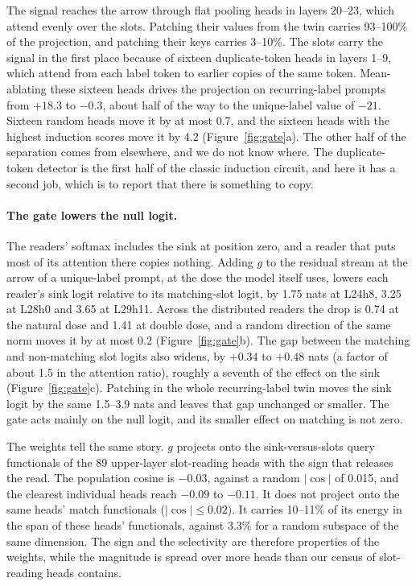 \documentclass{article}
\newcommand{\head}[2]{L#1h#2}
\begin{document}
The signal reaches the arrow through flat pooling heads in layers 20--23, which attend evenly over the slots. Patching their values from the twin carries 93--100\% of the projection, and patching their keys carries 3--10\%. The slots carry the signal in the first place because of sixteen duplicate-token heads in layers 1--9, which attend from each label token to earlier copies of the same token. Mean-ablating these sixteen heads drives the projection on recurring-label prompts from $+18.3$ to $-0.3$, about half of the way to the unique-label value of $-21$. Sixteen random heads move it by at most 0.7, and the sixteen heads with the highest induction scores move it by 4.2 (Figure~\ref{fig:gate}a). The other half of the separation comes from elsewhere, and we do not know where. The duplicate-token detector is the first half of the classic induction circuit, and here it has a second job, which is to report that there is something to copy.

\paragraph{The gate lowers the null logit.} The readers' softmax includes the sink at position zero, and a reader that puts most of its attention there copies nothing. Adding $g$ to the residual stream at the arrow of a unique-label prompt, at the dose the model itself uses, lowers each reader's sink logit relative to its matching-slot logit, by 1.75 nats at \head{24}{8}, 3.25 at \head{28}{0} and 3.65 at \head{29}{11}. Across the distributed readers the drop is 0.74 at the natural dose and 1.41 at double dose, and a random direction of the same norm moves it by at most 0.2 (Figure~\ref{fig:gate}b). The gap between the matching and non-matching slot logits also widens, by $+0.34$ to $+0.48$ nats (a factor of about 1.5 in the attention ratio), roughly a seventh of the effect on the sink (Figure~\ref{fig:gate}c). Patching in the whole recurring-label twin moves the sink logit by the same 1.5--3.9 nats and leaves that gap unchanged or smaller. The gate acts mainly on the null logit, and its smaller effect on matching is not zero.

The weights tell the same story. $g$ projects onto the sink-versus-slots query functionals of the 89 upper-layer slot-reading heads with the sign that releases the read. The population cosine is $-0.03$, against a random $|\cos|$ of 0.015, and the clearest individual heads reach $-0.09$ to $-0.11$. It does not project onto the same heads' match functionals ($|\cos| \le 0.02$). It carries 10--11\% of its energy in the span of these heads' functionals, against 3.3\% for a random subspace of the same dimension. The sign and the selectivity are therefore properties of the weights, while the magnitude is spread over more heads than our census of slot-reading heads contains.
\end{document}
